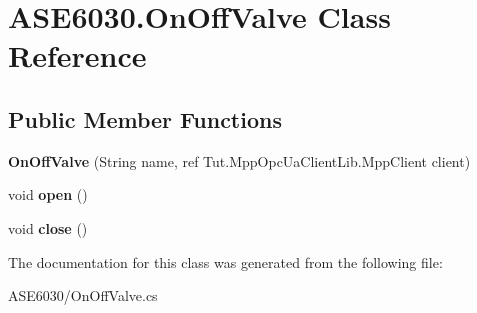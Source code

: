 \hypertarget{class_a_s_e6030_1_1_on_off_valve}{}\section{A\+S\+E6030.\+On\+Off\+Valve Class Reference}
\label{class_a_s_e6030_1_1_on_off_valve}
\subsection*{Public Member Functions}
\begin{DoxyCompactItemize}
\item 
\mbox{\label{class_a_s_e6030_1_1_on_off_valve_a210880c9d65d53684d468e0290b84772}} 
{\bfseries On\+Off\+Valve} (String name, ref Tut.\+Mpp\+Opc\+Ua\+Client\+Lib.\+Mpp\+Client client)
\item 
\mbox{\label{class_a_s_e6030_1_1_on_off_valve_a682309032082c36a32daa1f7672e4101}} 
void {\bfseries open} ()
\item 
\mbox{\label{class_a_s_e6030_1_1_on_off_valve_a4c878ae2b5970dff941dceb37f0aa863}} 
void {\bfseries close} ()
\end{DoxyCompactItemize}


The documentation for this class was generated from the following file\+:\begin{DoxyCompactItemize}
\item 
A\+S\+E6030/On\+Off\+Valve.\+cs\end{DoxyCompactItemize}
